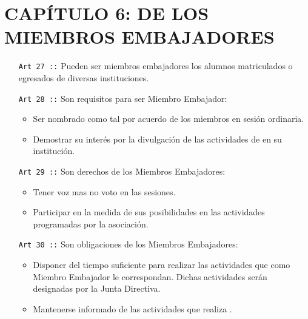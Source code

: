 \section*{CAPÍTULO 6: DE LOS MIEMBROS EMBAJADORES}
\begin{itemize}
  \item [\texttt{Art 27 ::}] Pueden ser miembros embajadores los alumnos matriculados o egresados de diversas instituciones.
  \item [\texttt{Art 28 ::}] Son requisitos para ser Miembro Embajador:
  \begin{itemize}
    \item Ser nombrado como tal por acuerdo de los miembros en sesión ordinaria.
    \item Demostrar su interés por la divulgación de las actividades de \flae en su institución.
  \end{itemize}
  \item [\texttt{Art 29 ::}] Son derechos de los Miembros Embajadores:
  \begin{itemize}
    \item Tener voz mas no voto en las sesiones.
    \item Participar en la medida de sus posibilidades en las actividades programadas por la asociación.
  \end{itemize}
  \item [\texttt{Art 30 ::}] Son obligaciones de los Miembros Embajadores:
  \begin{itemize}
    \item Disponer del tiempo suficiente para realizar las actividades que como Miembro Embajador le correspondan. Dichas actividades serán designadas por la Junta Directiva.
    \item Mantenerse informado de las actividades que realiza \flae.
  \end{itemize}

\end{itemize}
